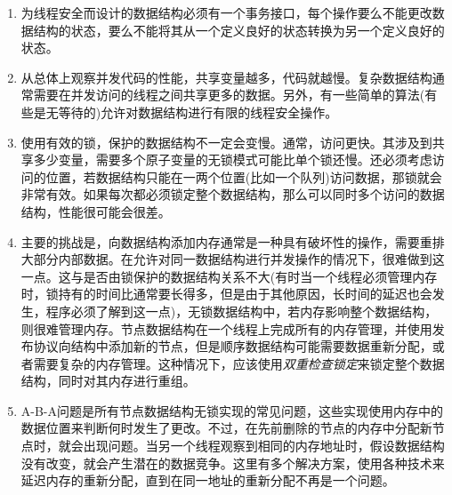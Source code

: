 \begin{enumerate}
\item 
为线程安全而设计的数据结构必须有一个事务接口，每个操作要么不能更改数据结构的状态，要么不能将其从一个定义良好的状态转换为另一个定义良好的状态。

\item 
从总体上观察并发代码的性能，共享变量越多，代码就越慢。复杂数据结构通常需要在并发访问的线程之间共享更多的数据。另外，有一些简单的算法(有些是无等待的)允许对数据结构进行有限的线程安全操作。

\item 
使用有效的锁，保护的数据结构不一定会变慢。通常，访问更快。其涉及到共享多少变量，需要多个原子变量的无锁模式可能比单个锁还慢。还必须考虑访问的位置，若数据结构只能在一两个位置(比如一个队列)访问数据，那锁就会非常有效。如果每次都必须锁定整个数据结构，那么可以同时多个访问的数据结构，性能很可能会很差。

\item
主要的挑战是，向数据结构添加内存通常是一种具有破坏性的操作，需要重排大部分内部数据。在允许对同一数据结构进行并发操作的情况下，很难做到这一点。这与是否由锁保护的数据结构关系不大(有时当一个线程必须管理内存时，锁持有的时间比通常要长得多，但是由于其他原因，长时间的延迟也会发生，程序必须了解到这一点)，无锁数据结构中，若内存影响整个数据结构，则很难管理内存。节点数据结构在一个线程上完成所有的内存管理，并使用发布协议向结构中添加新的节点，但是顺序数据结构可能需要数据重新分配，或者需要复杂的内存管理。这种情况下，应该使用\textit{双重检查锁定}来锁定整个数据结构，同时对其内存进行重组。

\item
A-B-A问题是所有节点数据结构无锁实现的常见问题，这些实现使用内存中的数据位置来判断何时发生了更改。不过，在先前删除的节点的内存中分配新节点时，就会出现问题。当另一个线程观察到相同的内存地址时，假设数据结构没有改变，就会产生潜在的数据竞争。这里有多个解决方案，使用各种技术来延迟内存的重新分配，直到在同一地址的重新分配不再是一个问题。

\end{enumerate}